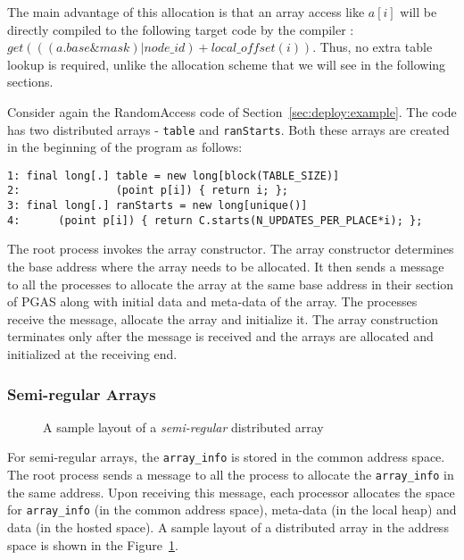 The main advantage of this allocation is that an array access like $a[i]$ will
be directly compiled to the following target code by the compiler : $get(((a.base \& mask) | node\_id) + local\_offset(i))$.
Thus, no extra table lookup is required, unlike the allocation scheme that we will see in the following
sections.

Consider again the RandomAccess code of Section~\ref{sec:deploy:example}. The code
has two distributed arrays - {\tt table} and {\tt ranStarts}. Both these arrays
are created in the beginning of the program as follows:

\begin{verbatim}
1: final long[.] table = new long[block(TABLE_SIZE)] 
2:               (point p[i]) { return i; };
3: final long[.] ranStarts = new long[unique()]
4:		(point p[i]) { return C.starts(N_UPDATES_PER_PLACE*i); };
\end{verbatim}

The root process invokes the array constructor. The array constructor
determines the base address where the array needs to be allocated. It then
sends a message to all the processes to allocate the array at the same
base address in their section of PGAS along with initial data
and meta-data of the array. The processes receive the message,
allocate the array and initialize it. The array construction terminates only
after the message is received and the arrays are allocated and initialized
at the receiving end.

\subsubsection{Semi-regular Arrays}

\begin{figure}
\center
\caption{A sample layout of a {\em semi-regular} distributed array}
\label{fig:array_layout_semiregular}
\end{figure}

For semi-regular arrays, the
{\tt array\_info} is stored in the common address space. The root process
sends a message to all the process to allocate the {\tt array\_info}
in the same address. Upon receiving this message, each processor
allocates the space for {\tt array\_info} (in the common address space), meta-data 
(in the local heap) and data (in the hosted space). A sample layout of a
distributed array in the address space is shown in the Figure~\ref{fig:array_layout_semiregular}.

